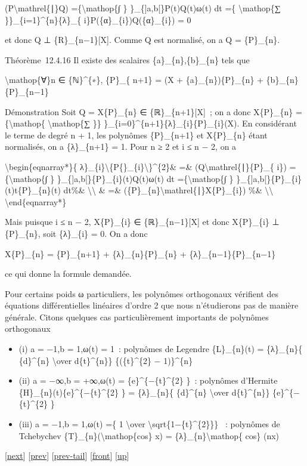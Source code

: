 \documentclass[]{article}
\begin{document}
(P\textbackslash{}mathrel\{∣\}Q) =\{\textbackslash{}mathop\{∫ \}
\}\_\{{]}a,b{[}\}P(t)Q(t)ω(t) dt =\{ \textbackslash{}mathop\{∑
\}\}\_\{i=1\}\^{}\{n\}\{λ\}\_\{ i\}P(\{α\}\_\{i\})Q(\{α\}\_\{i\}) = 0

et donc Q ⊥ \{R\}\_\{n−1\}{[}X{]}. Comme Q est normalisé, on a Q =
\{P\}\_\{n\}.

Théorème~12.4.16 Il existe des scalaires \{a\}\_\{n\},\{b\}\_\{n\} tels
que

\textbackslash{}mathop\{∀\}n ∈ \{ℕ\}\^{}\{∗\}, \{P\}\_\{ n+1\} = (X +
\{a\}\_\{n\})\{P\}\_\{n\} + \{b\}\_\{n\}\{P\}\_\{n−1\}

Démonstration Soit Q = X\{P\}\_\{n\} ∈ \{ℝ\}\_\{n+1\}{[}X{]}~; on a donc
X\{P\}\_\{n\} =\{\textbackslash{}mathop\{ \textbackslash{}mathop\{∑ \}\}
\}\_\{i=0\}\^{}\{n+1\}\{λ\}\_\{i\}\{P\}\_\{i\}(X). En considérant le
terme de degré n + 1, les polynômes \{P\}\_\{n+1\} et X\{P\}\_\{n\}
étant normalisés, on a \{λ\}\_\{n+1\} = 1. Pour n ≥ 2 et i ≤ n − 2, on a

\textbackslash{}begin\{eqnarray*\}\{
λ\}\_\{i\}\textbackslash{}\textbar{}\{P\{\}\_\{i\}\textbackslash{}\textbar{}\}\^{}\{2\}\&
=\& (Q\textbackslash{}mathrel\{∣\}\{P\}\_\{ i\})
=\{\textbackslash{}mathop\{∫ \} \}\_\{{]}a,b{[}\}\{P\}\_\{i\}(t)Q(t)ω(t)
dt =\{\textbackslash{}mathop\{∫ \}
\}\_\{{]}a,b{[}\}\{P\}\_\{i\}(t)t\{P\}\_\{n\}(t) dt\%\&
\textbackslash{}\textbackslash{} \& =\&
(\{P\}\_\{n\}\textbackslash{}mathrel\{∣\}X\{P\}\_\{i\}) \%\&
\textbackslash{}\textbackslash{} \textbackslash{}end\{eqnarray*\}

Mais puisque i ≤ n − 2, X\{P\}\_\{i\} ∈ \{ℝ\}\_\{n−1\}{[}X{]} et donc
X\{P\}\_\{i\} ⊥ \{P\}\_\{n\}, soit \{λ\}\_\{i\} = 0. On a donc

X\{P\}\_\{n\} = \{P\}\_\{n+1\} + \{λ\}\_\{n\}\{P\}\_\{n\} +
\{λ\}\_\{n−1\}\{P\}\_\{n−1\}

ce qui donne la formule demandée.

Pour certains poids ω particuliers, les polynômes orthogonaux vérifient
des équations différentielles linéaires d'ordre 2 que nous n'étudierons
pas de manière générale. Citons quelques cas particulièrement importants
de polynômes orthogonaux

\begin{itemize}
\itemsep1pt\parskip0pt
\item
  (i) a = −1,b = 1,ω(t) = 1~: polynômes de Legendre \{L\}\_\{n\}(t) =
  \{λ\}\_\{n\}\{ \{d\}\^{}\{n\} \textbackslash{}over d\{t\}\^{}\{n\}\}
  \{(\{t\}\^{}\{2\} − 1)\}\^{}\{n\}
\item
  (ii) a = −∞,b = +∞,ω(t) = \{e\}\^{}\{−\{t\}\^{}\{2\} \}~: polynômes
  d'Hermite \{H\}\_\{n\}(t)\{e\}\^{}\{−\{t\}\^{}\{2\} \} =
  \{λ\}\_\{n\}\{ \{d\}\^{}\{n\} \textbackslash{}over d\{t\}\^{}\{n\}\}
  \{e\}\^{}\{−\{t\}\^{}\{2\} \}
\item
  (iii) a = −1,b = 1,ω(t) =\{ 1 \textbackslash{}over
  \textbackslash{}sqrt\{1−\{t\}\^{}\{2\}\}\} ~: polynômes de Tchebychev
  \{T\}\_\{n\}(\textbackslash{}mathop\{cos\} x) =
  \{λ\}\_\{n\}\textbackslash{}mathop\{ cos\} (nx)
\end{itemize}

{[}\href{coursse71.html}{next}{]} {[}\href{coursse69.html}{prev}{]}
{[}\href{coursse69.html\#tailcoursse69.html}{prev-tail}{]}
{[}\href{coursse70.html}{front}{]}
{[}\href{coursch13.html\#coursse70.html}{up}{]}
\end{document}
